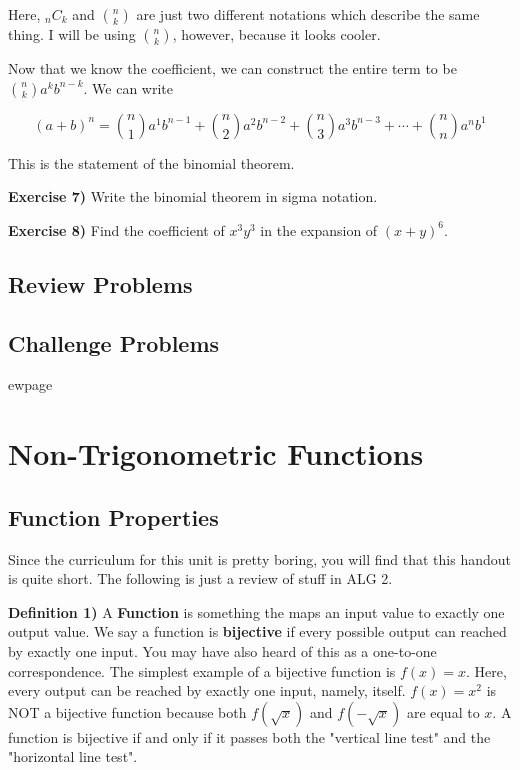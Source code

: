 \documentclass[a4paper]{article}
\begin{document}
Here, $_{n} C_{k}$ and $\binom{n}{k}$ are just two different notations which describe the same thing. I will be using $\binom{n}{k}$, however, because it looks cooler.

Now that we know the coefficient, we can construct the entire term to be $\binom{n}{k}a^{k}b^{n-k}$. We can write

$$(a+b)^n=\binom{n}{1}a^{1}b^{n-1} + \binom{n}{2}a^{2}b^{n-2} + \binom{n}{3}a^{3}b^{n-3} + \cdots + \binom{n}{n}a^{n}b^{1}$$

This is the statement of the binomial theorem.

\textbf{Exercise 7)} Write the binomial theorem in sigma notation.

\textbf{Exercise 8)} Find the coefficient of $x^3y^3$ in the expansion of $(x+y)^6$.
\subsection{Review Problems}

\subsection{Challenge Problems}


ewpage

\section{Non-Trigonometric Functions}

\subsection{Function Properties}

Since the curriculum for this unit is pretty boring, you will find that this handout is quite short. The following is just a review of stuff in ALG 2.

\textbf{Definition 1)} A \textbf{Function} is something the maps an input value to exactly one output value. We say a function is \textbf{bijective} if every possible output can reached by exactly one input. You may have also heard of this as a one-to-one correspondence. The simplest example of a bijective function is $f(x)=x$. Here, every output can be reached by exactly one input, namely, itself. $f(x)=x^2$ is NOT a bijective function because both $f(\sqrt{x})$ and $f(-\sqrt{x})$ are equal to $x$. A function is bijective if and only if it passes both the "vertical line test" and the "horizontal line test".
\end{document}

